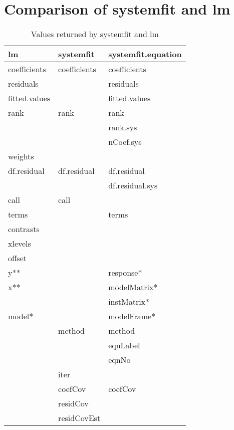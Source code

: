 \section{Comparison of systemfit and lm}

\begin{table}[htbp]
\caption{Values returned by systemfit and lm}
\begin{tabular}{lll}
\hline
lm & systemfit & systemfit.equation \\
\hline
coefficients    & coefficients   & coefficients \\
residuals       &                & residuals \\
fitted.values   &                & fitted.values \\
rank            & rank           & rank \\
                &                & rank.sys \\
                &                & nCoef.sys \\
weights         &                & \\
df.residual     & df.residual    & df.residual \\
                &                & df.residual.sys \\
call            & call           & \\
terms           &                & terms \\
contrasts       &                & \\
xlevels         &                & \\
offset          &                & \\
y**             &                & response* \\
x**             &                & modelMatrix* \\
                &                & instMatrix* \\
model*          &                & modelFrame* \\
                & method         & method \\
                &                & eqnLabel \\
                &                & eqnNo \\
                & iter           & \\
                & coefCov        & coefCov \\
                & residCov       & \\
                & residCovEst    & \\

\end{tabular}
\end{table}
